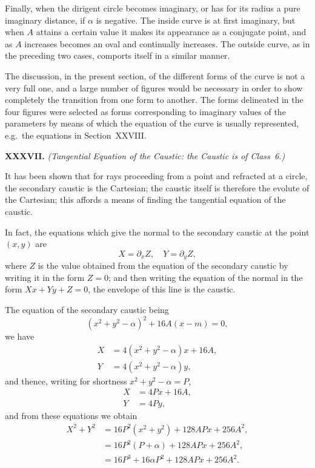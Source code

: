 \documentclass[11pt,a4paper]{book}
\begin{document}
\begin{center}
Finally, when the dirigent circle becomes imaginary, or has
for its radius a pure imaginary distance, \ie{} if $\alpha$ is negative.
The inside curve is at first imaginary, but when $A$ attains a
certain value it makes its appearance as a conjugate point,
and as $A$ increases becomes an oval and continually increases.
The outside curve, as in the preceding two cases, comports
itself in a similar manner.

The discussion, in the present section, of the different forms
of the curve is not a very full one, and a large number of
figures would be necessary in order to show completely the
transition from one form to another. The forms delineated in
the four figures were selected as forms corresponding to imaginary
values of the parameters by means of which the equation of the
curve is usually represented, e.g.\ the equations in Section~XXVIII.

\medskip\noindent\textbf{XXXVII.}
\textit{(Tangential Equation of the Caustic: the Caustic is of Class~6.)}

It has been shown that for rays proceeding from a point
and refracted at a circle, the secondary caustic is the Cartesian;
the caustic itself is therefore the evolute of the Cartesian;
this affords a means of finding the tangential equation of the caustic.

In fact, the equations which give the normal to the secondary
caustic at the point $(x, y)$ are
\[
X = \partial_{x}Z, \quad Y = \partial_{y}Z,
\]
where $Z$ is the value obtained from the equation of the secondary
caustic by writing it in the form $Z = 0$; and then writing the
equation of the normal in the form $Xx + Yy + Z = 0$, the envelope
of this line is the caustic.

The equation of the secondary caustic being
\[
(x^{2} + y^{2} - \alpha)^{2} + 16A(x - m) = 0,
\]
we have
\begin{align*}
X &= 4(x^{2} + y^{2} - \alpha)x + 16A, \\
Y &= 4(x^{2} + y^{2} - \alpha)y,
\end{align*}
and thence, writing for shortness $x^{2} + y^{2} - \alpha = P$,
\begin{align*}
X &= 4Px + 16A, \\
Y &= 4Py,
\end{align*}
and from these equations we obtain
\begin{align*}
X^{2} + Y^{2} &= 16P^{2}(x^{2} + y^{2}) + 128APx + 256A^{2}, \\
&= 16P^{2}(P + \alpha) + 128APx + 256A^{2}, \\
&= 16P^{3} + 16\alpha P^{2} + 128APx + 256A^{2}.
\end{align*}


\end{center}
\end{document}
